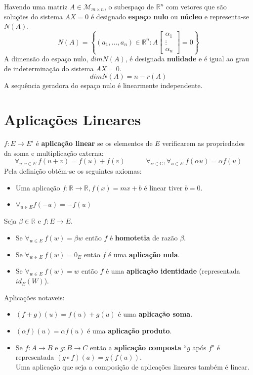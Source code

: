 \documentclass[]{report}
\begin{document}
Havendo uma matriz $A \in \mathcal{M}_{m \times n}$, o subespaço de $\mathbb{R}^n$ com vetores que são soluções do sistema $AX=0$ é designado \textbf{espaço nulo} ou \textbf{núcleo} e representa-se $N(A)$.
$$N(A) = \left\lbrace
(a_1, \dots, a_n) \in \mathbb{R}^n :
A \begin{bmatrix}
\alpha_1 \\ \vdots \\ \alpha_n
\end{bmatrix} = 0
\right\rbrace$$
A dimensão do espaço nulo, $dim N(A)$, é designada \textbf{nulidade} e é igual ao grau de indeterminação do sistema $AX=0$.
$$dim N(A) = n - r(A)$$
A sequência geradora do espaço nulo é linearmente independente.
\section{Aplicações Lineares}
$f:E \to E'$ é \textbf{aplicação linear} se os elementos de $E$ verificarem as propriedades da soma e multiplicação externa:
$$\forall_{u,v \in E} \> f(u+v) = f(u) + f(v) \quad \quad \quad
\forall_{\alpha \in \mathbb{C}}, \forall_{u \in E} \> f(\alpha u) = \alpha f(u)$$
Pela definição obtém-se os seguintes axiomas:
\begin{itemize}
\item Uma aplicação $f: \mathbb{R} \to \mathbb{R}, f(x) = mx + b$ é linear tiver $b=0$.
\item $\forall_{u \in E} f(-u) = -f(u)$
\end{itemize}
\vspace{2mm}
Seja $\beta \in \mathbb{R}$ e $f:E \to E$.
\begin{itemize}
\item Se $\forall_{w \in E} \> f(w) = \beta w$ então $f$ é \textbf{homotetia} de razão $\beta$.
\item Se $\forall_{w \in E} \> f(w) = 0_E$ então $f$ é uma \textbf{aplicação nula}.
\item Se $\forall_{w \in E} \> f(w) = w$ então $f$ é uma \textbf{aplicação identidade} (representada $id_E(W)$).
\end{itemize}
Aplicações notaveis:
\begin{itemize}
\item $(f+g)(u) = f(u)+g(u)$ é uma \textbf{aplicação soma}.
\item $(\alpha f)(u) = \alpha f(u)$ é uma \textbf{aplicação produto}.
\item Se $f:A \to B$ e $g:B \to C$ então a \textbf{aplicação composta} ``$g$ após $f$" é representada $(g \circ f)(a) = g(f(a))$.\\
Uma aplicação que seja a composição de aplicações lineares também é linear.
\end{itemize}
\end{document}
